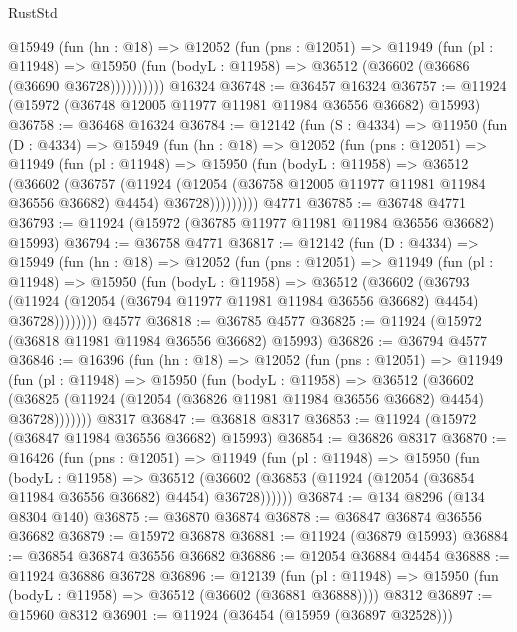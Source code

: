 \begin{lexlean}{RustStd}
\begin{coremodule}
        @15949
          (fun (hn : @18) =>
          @12052
            (fun (pns : @12051) =>
            @11949
              (fun (pl : @11948) =>
              @15950 (fun (bodyL : @11958) => @36512 (@36602 (@36686 (@36690 @36728))))))))))
    @16324
@36748 := @36457 @16324
@36757 := @11924 (@15972 (@36748 @12005 @11977 @11981 @11984 @36556 @36682) @15993)
@36758 := @36468 @16324
@36784 := @12142
    (fun (S : @4334) =>
    @11950
      (fun (D : @4334) =>
      @15949
        (fun (hn : @18) =>
        @12052
          (fun (pns : @12051) =>
          @11949
            (fun (pl : @11948) =>
            @15950
              (fun (bodyL : @11958) =>
              @36512
                (@36602
                  (@36757
                    (@11924
                      (@12054 (@36758 @12005 @11977 @11981 @11984 @36556 @36682) @4454)
                      @36728)))))))))
    @4771
@36785 := @36748 @4771
@36793 := @11924 (@15972 (@36785 @11977 @11981 @11984 @36556 @36682) @15993)
@36794 := @36758 @4771
@36817 := @12142
    (fun (D : @4334) =>
    @15949
      (fun (hn : @18) =>
      @12052
        (fun (pns : @12051) =>
        @11949
          (fun (pl : @11948) =>
          @15950
            (fun (bodyL : @11958) =>
            @36512
              (@36602
                (@36793
                  (@11924 (@12054 (@36794 @11977 @11981 @11984 @36556 @36682) @4454) @36728))))))))
    @4577
@36818 := @36785 @4577
@36825 := @11924 (@15972 (@36818 @11981 @11984 @36556 @36682) @15993)
@36826 := @36794 @4577
@36846 := @16396
    (fun (hn : @18) =>
    @12052
      (fun (pns : @12051) =>
      @11949
        (fun (pl : @11948) =>
        @15950
          (fun (bodyL : @11958) =>
          @36512
            (@36602
              (@36825 (@11924 (@12054 (@36826 @11981 @11984 @36556 @36682) @4454) @36728)))))))
    @8317
@36847 := @36818 @8317
@36853 := @11924 (@15972 (@36847 @11984 @36556 @36682) @15993)
@36854 := @36826 @8317
@36870 := @16426
    (fun (pns : @12051) =>
    @11949
      (fun (pl : @11948) =>
      @15950
        (fun (bodyL : @11958) =>
        @36512 (@36602 (@36853 (@11924 (@12054 (@36854 @11984 @36556 @36682) @4454) @36728))))))
@36874 := @134 @8296 (@134 @8304 @140)
@36875 := @36870 @36874
@36878 := @36847 @36874 @36556 @36682
@36879 := @15972 @36878
@36881 := @11924 (@36879 @15993)
@36884 := @36854 @36874 @36556 @36682
@36886 := @12054 @36884 @4454
@36888 := @11924 @36886 @36728
@36896 := @12139
    (fun (pl : @11948) => @15950 (fun (bodyL : @11958) => @36512 (@36602 (@36881 @36888))))
    @8312
@36897 := @15960 @8312
@36901 := @11924 (@36454 (@15959 (@36897 @32528)))

\end{coremodule}
\end{lexlean}

